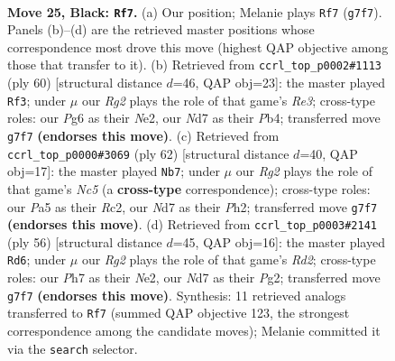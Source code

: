 \documentclass[11pt]{article}
\begin{document}
\clearpage

\begin{figure}[p]\centering
\begin{subfigure}{0.46\textwidth}\centering
\resizebox{\linewidth}{!}{%
\newchessgame
\chessboard[
  setfen={3k4/Nppnp1rp/6pB/p7/7P/2P2P2/P1n1KP2/7R b - - 4 25},
  showmover=false,
  pgfstyle=straightmove, color=movearrow, markmove={g7-f7}
]}
\caption{}
\end{subfigure}\hfill
\begin{subfigure}{0.46\textwidth}\centering
\resizebox{\linewidth}{!}{%
\newchessgame
\chessboard[
  setfen={2r5/5p2/p1p3k1/3p1p2/PP3P2/1KP1R3/4Nb1P/8 w - - 2 31},
  showmover=false,
  pgfstyle=straightmove, color=movearrow, markmove={e3-f3}
]}
\caption{}
\end{subfigure}
\\[4pt]
\begin{subfigure}{0.46\textwidth}\centering
\resizebox{\linewidth}{!}{%
\newchessgame
\chessboard[
  setfen={7k/2p1rp1p/B2n1p2/p1NP4/3b4/6P1/P1R2PKP/8 w - - 8 32},
  showmover=false,
  pgfstyle=straightmove, color=movearrow, markmove={c5-b7}
]}
\caption{}
\end{subfigure}\hfill
\begin{subfigure}{0.46\textwidth}\centering
\resizebox{\linewidth}{!}{%
\newchessgame
\chessboard[
  setfen={5rk1/1p4pp/2p5/p3Pp2/5P2/1n3K1P/1P1RN1P1/8 w - - 0 29},
  showmover=false,
  pgfstyle=straightmove, color=movearrow, markmove={d2-d6}
]}
\caption{}
\end{subfigure}
\caption{\textbf{Move 25, Black: \texttt{Rf7}.} (a) Our position; Melanie plays \texttt{Rf7} (\texttt{g7f7}). Panels (b)--(d) are the retrieved master positions whose correspondence most drove this move (highest QAP objective among those that transfer to it). (b) Retrieved from \texttt{ccrl\_top\_p0002\#1113} (ply 60) [structural distance $d$=46, QAP obj=23]: the master played \texttt{Rf3}; under $\mu$ our \emph{Rg2} plays the role of that game's \emph{Re3}; cross-type roles: our \emph{P}g6 as their \emph{N}e2, our \emph{N}d7 as their \emph{P}b4; transferred move \texttt{g7f7} \textbf{(endorses this move)}. (c) Retrieved from \texttt{ccrl\_top\_p0000\#3069} (ply 62) [structural distance $d$=40, QAP obj=17]: the master played \texttt{Nb7}; under $\mu$ our \emph{Rg2} plays the role of that game's \emph{Nc5} (a \textbf{cross-type} correspondence); cross-type roles: our \emph{P}a5 as their \emph{R}c2, our \emph{N}d7 as their \emph{P}h2; transferred move \texttt{g7f7} \textbf{(endorses this move)}. (d) Retrieved from \texttt{ccrl\_top\_p0003\#2141} (ply 56) [structural distance $d$=45, QAP obj=16]: the master played \texttt{Rd6}; under $\mu$ our \emph{Rg2} plays the role of that game's \emph{Rd2}; cross-type roles: our \emph{P}h7 as their \emph{N}e2, our \emph{N}d7 as their \emph{P}g2; transferred move \texttt{g7f7} \textbf{(endorses this move)}. Synthesis: 11 retrieved analogs transferred to \texttt{Rf7} (summed QAP objective 123, the strongest correspondence among the candidate moves); Melanie committed it via the \texttt{search} selector.}
\label{fig:thought-m49}
\end{figure}
\end{document}
